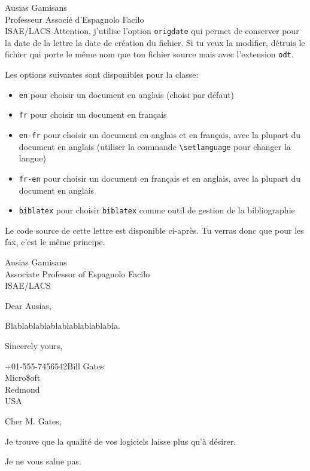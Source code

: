 \documentclass[pdftex,a4paper,12pt,origdate,fr]{supaero-lettre}
\begin{document}
\begin{letter}{Ausias Gamisans\\ Professeur Associé d'Espagnolo
    Facilo\\ISAE/LACS}
Attention, j'utilise l'option \texttt{origdate} qui permet de
conserver pour la date de la lettre la date de création du fichier. Si
tu veux la modifier, détruis le fichier qui porte le même nom que ton
fichier source mais avec l'extension \texttt{odt}.

Les options suivantes sont disponibles pour la classe:
\begin{itemize}
\item \verb!en! pour choisir un document en anglais (choisi par
  défaut)
\item \verb!fr! pour choisir un document en français
\item \verb!en-fr! pour choisir un document en anglais et en français,
  avec la plupart du document en anglais (utiliser la commande
  \verb!\setlanguage! pour changer la langue)
\item \verb!fr-en! pour choisir un document en français et en anglais,
  avec la plupart du document en anglais
\item \verb!biblatex! pour choisir \verb!biblatex! comme outil de
  gestion de la bibliographie
\end{itemize}

Le code source de cette lettre est disponible ci-après. Tu verras donc
que pour les fax, c'est le même principe.



\end{letter}

\begin{letter}{Ausias Gamisans\\ Associate Professor of Espagnolo Facilo\\ISAE/LACS}

\anglais

\signature{Christophe Garion}



\opening{Dear Ausias,}

Blablablablablablablablablabla.

\closing{Sincerely yours,}

\end{letter}

\begin{telefax}{+01-555-7456542}{Bill Gates\\Micro\$oft\\Redmond\\USA}


\opening{Cher M. Gates,}

Je trouve que la qualité de vos logiciels laisse plus qu'à désirer.

\closing{Je ne vous salue pas.}

\end{telefax}
\end{document}

